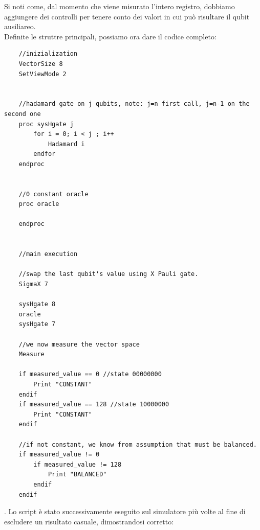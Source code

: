 \documentclass[12pt,a4paper,openright]{report}
\begin{document}
Si noti come, dal momento che viene misurato l'intero registro, dobbiamo aggiungere dei controlli per tenere conto dei valori in cui può risultare il qubit ausiliareo.\\

\newpage
Definite le struttre principali, possiamo ora dare il codice completo:

\begin{lstlisting}
    //inizialization
    VectorSize 8
    SetViewMode 2
    
    
    //hadamard gate on j qubits, note: j=n first call, j=n-1 on the second one
    proc sysHgate j
        for i = 0; i < j ; i++
            Hadamard i
        endfor
    endproc
    
    
    //0 constant oracle
    proc oracle

    endproc
    
    
    //main execution
    
    //swap the last qubit's value using X Pauli gate.
    SigmaX 7
    
    sysHgate 8
    oracle
    sysHgate 7
    
    //we now measure the vector space
    Measure
    
    if measured_value == 0 //state 00000000 
        Print "CONSTANT"
    endif
    if measured_value == 128 //state 10000000
        Print "CONSTANT"
    endif
    
    //if not constant, we know from assumption that must be balanced.
    if measured_value != 0
        if measured_value != 128
            Print "BALANCED"
        endif
    endif
    \end{lstlisting}

. Lo script è stato successivamente eseguito sul simulatore più volte al fine di escludere un risultato casuale, dimostrandosi corretto:
\end{document}
